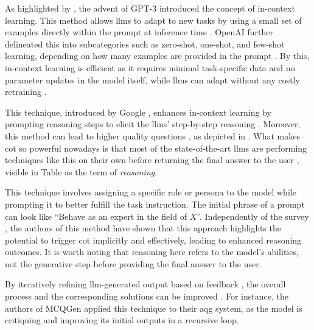  As highlighted by \cite{zhao_survey_2025}, the advent of GPT-3 \cite{brown_language_2020} introduced the concept of in-context learning. This method allows \acp{llm} to adapt to new tasks by using a small set of examples directly within the prompt at inference time \cite{minaee_large_2025}. OpenAI further delineated this into subcategories such as zero-shot, one-shot, and few-shot learning, depending on how many examples are provided in the prompt \cite{brown_language_2020}. By this, in-context learning is efficient as it requires minimal task-specific data and no parameter updates in the model itself, while \acp{llm} can adapt without any costly retraining \cite{patil_review_2024,hou_large_2024}.

 This technique, introduced by Google \cite{wei_chain--thought_2022}, enhances in-context learning by prompting reasoning steps to elicit the \acp{llm}' step-by-step reasoning \cite{zhao_survey_2025}. Moreover, this method can lead to higher quality questions \cite{scaria_automated_2024}, as depicted in \cite{wei_chain--thought_2022}. What makes \ac{cot} so powerful nowadays is that most of the state-of-the-art \acp{llm} are performing techniques like this on their own before returning the final answer to the user \cite{openai_openai_2024-1}, visible in Table  as the term of \textit{reasoning}.

 This technique involves assigning a specific role or persona to the model while prompting it \cite{zhao_survey_2025} to better fulfill the task instruction. The initial phrase of a prompt can look like \enquote{Behave as an expert in the field of $X$}. Independently of the survey \cite{zhao_survey_2025}, the authors of this method \cite{kong_better_2024} have shown that this approach highlights the potential to trigger \ac{cot} implicitly and effectively, leading to enhanced reasoning outcomes. It is worth noting that reasoning here refers to the model's abilities, not the generative step before providing the final answer to the user.

 By iteratively refining \ac{llm}-generated output based on feedback \cite{madaan_self-refine_2023}, the overall process and the corresponding solutions can be improved \cite{zhao_survey_2025}. For instance, the authors of MCQGen \cite{hang_mcqgen_2024} applied this technique to their \ac{aqg} system, as the model is critiquing and improving its initial outputs in a recursive loop.

